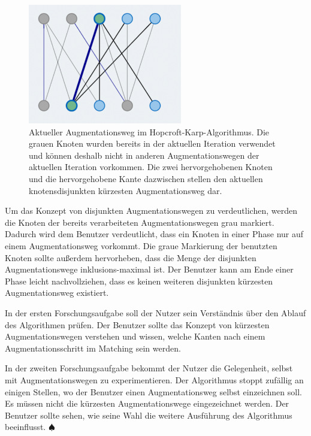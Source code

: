 \begin{figure}[h!]
	\centering
	\includegraphics[width=0.60\textwidth]{figures/hopcroft_karp_augmentation}
	\caption[Hopcroft-Karp: Augmentationsweg]{Aktueller Augmentationsweg im Hopcroft-Karp-Algorithmus. Die grauen Knoten wurden bereits in der aktuellen Iteration verwendet und können deshalb nicht in anderen Augmentationswegen der aktuellen Iteration vorkommen. Die zwei hervorgehobenen Knoten und die hervorgehobene Kante dazwischen stellen den aktuellen knotensdisjunkten kürzesten Augmentationsweg dar.}\label{fig:hopcroft_karp_augmentation}
\end{figure}

Um das Konzept von disjunkten Augmentationswegen zu verdeutlichen, werden die Knoten der bereits verarbeiteten Augmentationswegen grau markiert. Dadurch wird dem Benutzer verdeutlicht, dass ein Knoten in einer Phase nur auf einem Augmentationsweg vorkommt. 
Die graue Markierung der benutzten Knoten sollte außerdem hervorheben, dass die Menge der disjunkten Augmentationswege inklusions-maximal ist. Der Benutzer kann am Ende einer Phase leicht nachvollziehen, dass es keinen weiteren disjunkten kürzesten Augmentationsweg existiert.

In der ersten Forschungsaufgabe soll der Nutzer sein Verständnis über den Ablauf des Algorithmen prüfen. Der Benutzer sollte das Konzept von kürzesten Augmentationswegen verstehen und wissen, welche Kanten nach einem Augmentationsschritt im Matching sein werden.

In der zweiten Forschungsaufgabe bekommt der Nutzer die Gelegenheit, selbst mit Augmentationswegen zu experimentieren. Der Algorithmus stoppt zufällig an einigen Stellen, wo der Benutzer einen Augmentationsweg selbst einzeichnen soll. Es müssen nicht die kürzesten Augmentationswege eingezeichnet werden. Der Benutzer sollte sehen, wie seine Wahl die weitere Ausführung des Algorithmus beeinflusst. \hfill$\spadesuit$

